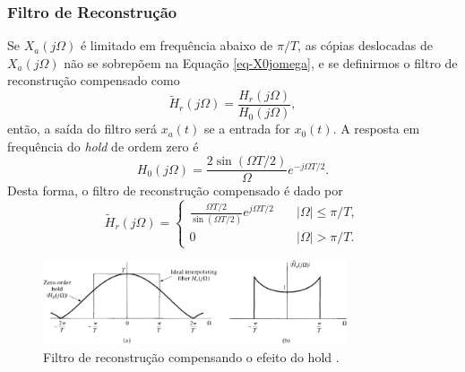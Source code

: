 \begin{frame}[allowframebreaks]
  \frametitle{Filtro de Reconstrução}
  Se $X_a(j \Omega)$ é limitado em frequência abaixo de $\pi/T$,
  as cópias deslocadas de $X_a(j \Omega)$ não se sobrepõem na Equação \ref{eq-X0jomega},
  e se definirmos o filtro de reconstrução compensado como
  \begin{equation}
  \tilde{H}_r (j\Omega) = \frac{H_r (j\Omega)}{H_0(j \Omega)},
  \end{equation}
  então, a saída do filtro será $x_a(t)$ se a entrada for $x_0(t)$.
  A resposta em frequência do \textit{hold} de ordem zero é
  \begin{equation}
  H_0 (j\Omega) = \frac{2 \sin(\Omega T/2)}{\Omega} e^{-j\Omega T/2} .
  \end{equation}
  Desta forma, o filtro de reconstrução compensado é dado por
  \begin{equation}
  \tilde{H}_r (j\Omega) = \begin{cases}\frac{\Omega T/2}{\sin(\Omega T/2)} e^{j \Omega T /2} \quad & |\Omega| \leq \pi/T ,\\
                                     0 & |\Omega| > \pi/T .\end{cases}
  \end{equation}

  \begin{figure}[h!]
  \centering
  \includegraphics[width=0.8\textwidth]{images/oppenheim_fig454.png}
  \caption{Filtro de reconstrução compensando o efeito do hold \citep{oppenheim2009}.}
  \label{fig:oppenheim_fig454}
  \end{figure}

\end{frame}


